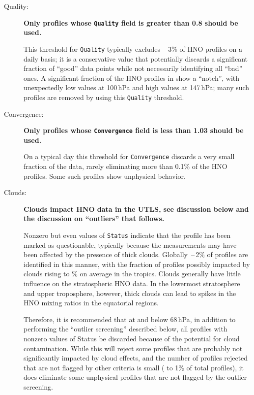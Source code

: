 \documentclass[11pt,draft]{report}
\newcommand{\screeningrule}[1]{\textbf{#1}\par}
\newcommand{\qualityrule}[1]{\screeningrule{Only
    profiles whose \texttt{Quality} field is greater than #1 should be used.}}
\newcommand{\convergencerule}[1]{\screeningrule{Only profiles whose
    \texttt{Convergence} field is less than #1 should be used.}}
\providecommand{\DIFaddtex}[1]{{\protect\color{blue}\uwave{#1}}} %
\providecommand{\DIFaddbegin}{} %
\providecommand{\DIFaddend}{} %
\providecommand{\DIFdelbegin}{} %
\providecommand{\DIFdelend}{} %
\providecommand{\DIFadd}[1]{\texorpdfstring{\DIFaddtex{#1}}{#1}} %
\begin{document}
\begin{description}
\item[Quality:] \qualityrule{0.8} \DIFdelbegin %

\DIFdelend This threshold for \texttt{Quality}
  typically excludes \,--\,3\% of HNO profiles on a
  daily basis; it is a conservative value that potentially discards a
  significant fraction of ``good'' data points while not necessarily
  identifying all ``bad'' ones.  A significant fraction of the HNO
  profiles in \thisv show a ``notch'', with unexpectedly low \DIFaddbegin \DIFadd{(often
  negative in the tropics) }\DIFaddend values at 100\,hPa and high values at
  147\,hPa; many such profiles are removed by using this
  \texttt{Quality} threshold.

\item[Convergence:] \convergencerule{1.03} \DIFdelbegin %

\DIFdelend On a typical day this
  threshold for \texttt{Convergence} discards a very small fraction of
  the data, rarely eliminating more than 0.1\% of the HNO profiles.
  Some such profiles show unphysical behavior.

\item[Clouds:] \screeningrule{Clouds impact HNO data in the UTLS,
    see discussion below and the discussion on ``outliers'' that
    follows.}  \DIFdelbegin %

\DIFdelend Nonzero but even values of \texttt{Status} indicate that
  the profile has been marked as questionable, typically because the
  measurements may have been affected by the presence of thick clouds.
  Globally \,--\,2\% of profiles are identified in this
  manner, with the fraction of profiles possibly impacted by clouds
  rising to \% on average in the tropics.  Clouds
  generally have little influence on the stratospheric HNO data.  In
  the lowermost stratosphere and upper troposphere, however, thick
  clouds can lead to spikes in the HNO mixing ratios in the
  equatorial regions.

  Therefore, it is recommended that at and below 68\,hPa, in addition to
  performing the ``outlier screening'' described below, all profiles
  with nonzero values of Status be discarded because of the potential
  for cloud contamination.  While this will reject some profiles that
  are probably not significantly impacted by cloud effects, and the
  number of profiles rejected that are not flagged by other criteria is
  small ( to 1\% of total profiles), it does eliminate
  some unphysical profiles that are not flagged by the outlier
  screening.


\end{description}
\end{document}
